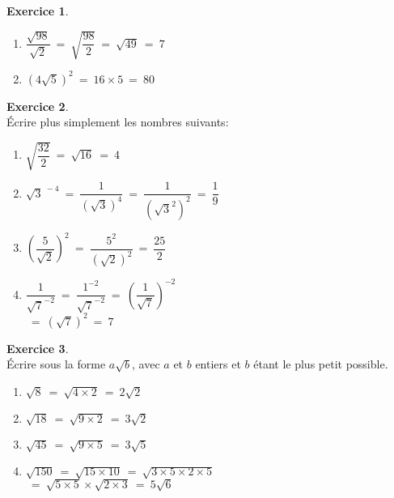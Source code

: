 \documentclass[10pt,a4paper]{article}
\theoremstyle{definition}
\theoremstyle{definition}
\newtheorem{exo}{Exercice}
\begin{document}
\begin{center}
\begin{minipage}[c]{0.4\linewidth}
\begin{exo}
\begin{enumerate}
					\item $\dfrac{\sqrt{98}}{\sqrt{2}} \ = \ \sqrt{\dfrac{98}{2}}  \ = \ \sqrt{49} \ = \ 7$
					\item $(4\sqrt{5})^2 \ = \ 16\times5 \ = \ 80$
					 
				\end{enumerate}  
		
		\end{exo}
	\end{minipage}
	\hfill\vrule\hfill
	\begin{minipage}[c]{0.4\linewidth}
		\raggedright
		\begin{exo}\quad\hfill\textbf{}\\
			Écrire plus simplement les nombres suivants:
		
				\begin{enumerate}
					\item $\sqrt{\dfrac{32}{2}} \ = \ \sqrt{16} \ = \ 4$
					\item $\sqrt{3}^{~-4} \ = \ \dfrac{1}{\left(\sqrt{3}\right)^4} \ = \ \dfrac{1}{\left(\sqrt{3}^2\right)^2} \ = \ \dfrac{1}{9}$
				
					
					\item $\left(\dfrac{5}{\sqrt{2}}\right)^2 \ = \ \dfrac{5^2}{\left(\sqrt{2}\right)^2} \ = \ \dfrac{25}{2} $
					
					\item $\dfrac{1}{\sqrt{7}^{-2}} \ = \ \dfrac{1^{-2}}{\sqrt{7}^{-2}}  \ = \ \left(\dfrac{1}{\sqrt{7}}\right)^{-2}$\\ $ \ = \ \left(\sqrt{7}\right)^2 \ = \ 7$
					
				\end{enumerate}  

		\end{exo}
		\begin{exo}\quad\hfill\textbf{}\\
				Écrire sous la forme $a\sqrt b$, avec $a$ et $b$ entiers et $b$ étant le
				plus petit possible.
			
				\begin{enumerate}
					\item $\sqrt{8} \ = \ \sqrt{4\times2} \ =  \  2\sqrt{2}$  
					\item $\sqrt{18} \ = \ \sqrt{9\times2} \ = \ 3\sqrt{2}$
					
					\item $\sqrt{45} \ = \ \sqrt{9\times5} \ =  \ 3\sqrt{5}$
					\item $\sqrt{150} \ = \  \sqrt{15\times  10}  \   =  \ \sqrt{ 3 \times 5 \times 2 \times 5}$\\
					$ \ = \  \sqrt{5\times5} \times\sqrt{2\times3}\ = \ 5\sqrt{6} $
					

\end{enumerate}
\end{exo}
\end{minipage}
\end{center}
\end{document}

